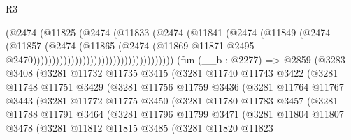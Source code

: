 \begin{lexlean}{R3}
\begin{coremodule}
                                                  (@2474
                                                    (@11825
                                                      (@2474
                                                        (@11833
                                                          (@2474
                                                            (@11841
                                                              (@2474
                                                                (@11849
                                                                  (@2474
                                                                    (@11857
                                                                      (@2474
                                                                        (@11865
                                                                          (@2474
                                                                            (@11869
                                                                              @11871
                                                                              @2495
                                                                              @2470)))))))))))))))))))))))))))))))))))))
    (fun (__b : @2277) =>
    @2859
      (@3283
        @3408
        (@3281
          @11732
          @11735
          @3415
          (@3281
            @11740
            @11743
            @3422
            (@3281
              @11748
              @11751
              @3429
              (@3281
                @11756
                @11759
                @3436
                (@3281
                  @11764
                  @11767
                  @3443
                  (@3281
                    @11772
                    @11775
                    @3450
                    (@3281
                      @11780
                      @11783
                      @3457
                      (@3281
                        @11788
                        @11791
                        @3464
                        (@3281
                          @11796
                          @11799
                          @3471
                          (@3281
                            @11804
                            @11807
                            @3478
                            (@3281
                              @11812
                              @11815
                              @3485
                              (@3281
                                @11820
                                @11823

\end{coremodule}
\end{lexlean}
